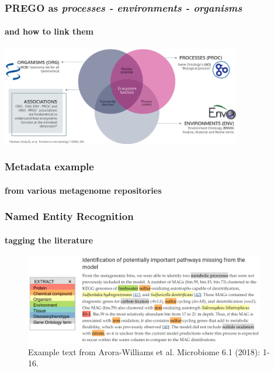 \documentclass{beamer}
\begin{document}
   \begin{frame}
      \frametitle{PREGO as \textit{processes - environments - organisms}}
      \framesubtitle{and how to link them}
      \includegraphics[width=105mm]{resources/prego_triple_associations.png}
   \end{frame}

   \begin{frame}

      \frametitle{Metadata example}
      \framesubtitle{from various metagenome repositories}
   \end{frame}

   \begin{frame}
      \frametitle{Named Entity Recognition}
      \framesubtitle{tagging the literature}
      \begin{figure}
         \includegraphics[width=105mm]{resources/extract_example_transp.png}
         \caption{
            \scriptsize Example text from Arora-Williams et al. Microbiome 6.1 (2018): 1-16.
         }
      \end{figure}
      
   \end{frame}
\end{document}

